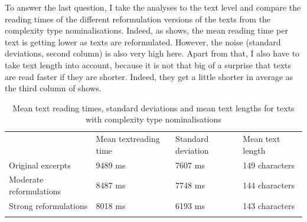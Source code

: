 \documentclass[output=paper]{langsci/langscibook}
\begin{document}
To answer the last question, I take the analyses to the text level and compare the reading times of the different reformulation versions of the texts from the complexity type nominalisations. Indeed, as  shows, the mean reading time per text is getting lower as texts are reformulated. However, the noise (standard deviations, second column) is also very high here. Apart from that, I also have to take text length into account, because it is not that big of a surprise that texts are read faster if they are shorter. Indeed, they get a little shorter in average as the third column of  shows.
\begin{table}
\begin{tabularx}{\textwidth}{lXXX} 
& Mean text\newline reading time & Standard \newline deviation & Mean text \newline length\\
\lsptoprule
 Original excerpts & 9489 ms & 7607 ms & 149 characters\\
 Moderate reformulations & 8487 ms & 7748 ms & 144 characters\\
 Strong reformulations & 8018 ms & 6193 ms & 143 characters\\
\lspbottomrule
\end{tabularx}
\caption{Mean text reading times, standard deviations and mean text lengths for texts with complexity type nominalisations}
\label{wolfer:tab:4}
\end{table}
\end{document}
